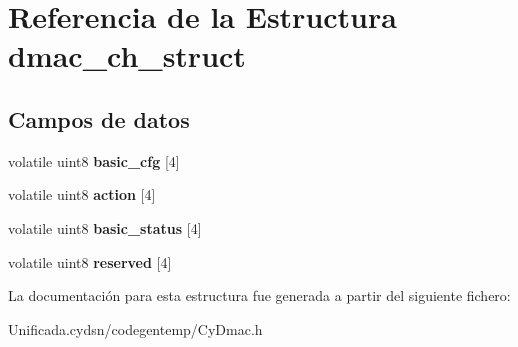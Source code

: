 \hypertarget{structdmac__ch__struct}{}\section{Referencia de la Estructura dmac\+\_\+ch\+\_\+struct}
\label{structdmac__ch__struct}
\subsection*{Campos de datos}
\begin{DoxyCompactItemize}
\item 
\mbox{\label{structdmac__ch__struct_aa8802acad6a990eabb621daf3257429e}} 
volatile uint8 {\bfseries basic\+\_\+cfg} \mbox{[}4\mbox{]}
\item 
\mbox{\label{structdmac__ch__struct_a2f96d2cba89601844e35cc1600ebe105}} 
volatile uint8 {\bfseries action} \mbox{[}4\mbox{]}
\item 
\mbox{\label{structdmac__ch__struct_a040ab57286d4d588b07396c50eac1a58}} 
volatile uint8 {\bfseries basic\+\_\+status} \mbox{[}4\mbox{]}
\item 
\mbox{\label{structdmac__ch__struct_a65cad7eae9215ffdf49e4f6dd5803c20}} 
volatile uint8 {\bfseries reserved} \mbox{[}4\mbox{]}
\end{DoxyCompactItemize}


La documentación para esta estructura fue generada a partir del siguiente fichero\+:\begin{DoxyCompactItemize}
\item 
Unificada.\+cydsn/codegentemp/Cy\+Dmac.\+h\end{DoxyCompactItemize}
